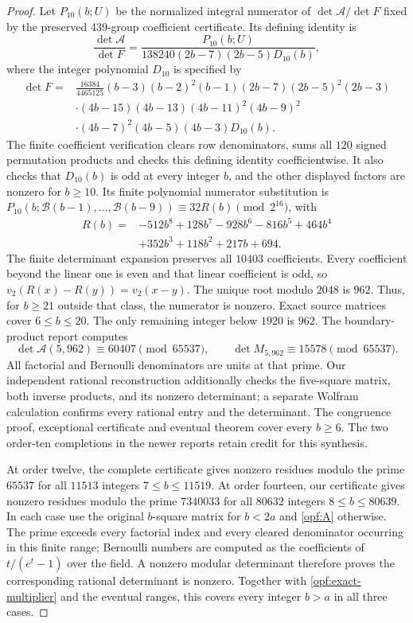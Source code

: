 \begin{proof}
Let $P_{10}(b;U)$ be the normalized integral numerator of
$\det\mathcal A/\det F$ fixed by the preserved 439-group
coefficient certificate. Its defining identity is
\[
 \frac{\det\mathcal A}{\det F}
 =\frac{P_{10}(b;U)}{138240(2b-7)(2b-5)D_{10}(b)},
\]
where the integer polynomial $D_{10}$ is specified by
\begin{align*}
 \det F={}&\frac{16384}{4465125}(b-3)(b-2)^2(b-1)
                  (2b-7)(2b-5)^2(2b-3)\\
 &\cdot(4b-15)(4b-13)(4b-11)^2(4b-9)^2\\
 &\cdot(4b-7)^2(4b-5)(4b-3)D_{10}(b).
\end{align*}
The finite coefficient verification clears row denominators, sums
all $120$ signed permutation products and checks this defining
identity coefficientwise. It also checks that $D_{10}(b)$ is odd
at every integer $b$, and the other displayed factors are nonzero
for $b\ge10$. Its finite polynomial numerator substitution is
$P_{10}(b;\mathcal B(b-1),\ldots,\mathcal B(b-9))
\equiv32R(b)\pmod{2^{16}}$, with
\begin{align*}
 R(b)={}&-512b^8+128b^7-928b^6-816b^5+464b^4\\
        &+352b^3+118b^2+217b+694.
\end{align*}
The finite determinant expansion preserves all $10403$ coefficients.
Every coefficient beyond the linear one is even and that linear
coefficient is odd, so $v_2(R(x)-R(y))=v_2(x-y)$. The unique root
modulo $2048$ is $962$. Thus, for $b\ge21$ outside that class,
the numerator is nonzero. Exact source matrices cover $6\le b\le20$.
The only remaining integer below $1920$ is $962$. The
boundary-product report computes
\[
 \det\mathcal A(5,962)\equiv60407\pmod{65537},\qquad
 \det M_{5,962}\equiv15578\pmod{65537}.
\]
All factorial and Bernoulli denominators are units at that prime.
Our independent rational reconstruction additionally checks the
five-square matrix, both inverse products, and its nonzero determinant;
a separate Wolfram calculation confirms every rational entry and
the determinant. The congruence proof, exceptional certificate and
eventual theorem cover every $b\ge6$. The two order-ten completions
in the newer reports retain credit for this synthesis.

At order twelve, the complete certificate gives nonzero residues
modulo the prime $65537$ for all $11513$ integers $7\le b\le11519$.
At order fourteen, our certificate gives nonzero residues modulo
the prime $7340033$ for all $80632$ integers $8\le b\le80639$.
In each case use the original $b$-square matrix for $b<2a$ and
\eqref{opf:A} otherwise. The prime exceeds every factorial index
and every cleared denominator occurring in this finite range;
Bernoulli numbers are computed as the coefficients of
$t/(e^t-1)$ over the field. A nonzero modular determinant therefore
proves the corresponding rational determinant is nonzero.
Together with \eqref{opf:exact-multiplier} and the eventual ranges,
this covers every integer $b>a$ in all three cases.


\end{proof}
